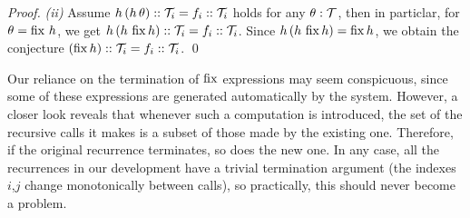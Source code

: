 \begin{proof}
{\it (ii)} Assume $h\,(h\,\theta) :: \mathcal{T}_i = f_i :: \mathcal{T}_i$ holds for any $\theta:\mathcal{T}$,
then in particlar, for $\theta=\operatorname{fix}\,h$, we get $h\,(h\,\operatorname{fix} h) :: \mathcal{T}_i = f_i :: \mathcal{T}_i$.
Since $h\,(h\,\operatorname{fix} h) = \operatorname{fix} h$, we obtain the conjecture $(\operatorname{fix} h) :: \mathcal{T}_i = f_i :: \mathcal{T}_i$.
\qed
\end{proof}

\medskip
Our reliance on the termination of $\operatorname{fix}$ expressions may seem conspicuous, since some of these
expressions are generated automatically by the system. However, a closer look reveals that whenever
such a computation is introduced, the set of the recursive calls it makes is a subset of those made by the existing one.
Therefore, if the original recurrence terminates, so does the new one. In any case, all the recurrences
in our development have a trivial termination argument (the indexes $i$,$j$ change monotonically between calls),
so practically, this should never become a problem.

\newcommand\vtyped[2]{\underset{\scriptscriptstyle ( #2 )}{ #1 }}

